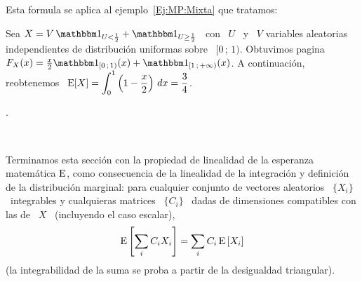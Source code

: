 {Esta formula se aplica al ejemplo~\ref{Ej:MP:Mixta} que tratamos:
%
\begin{ejemplo}\label{Ej:MP:EspMixtaPositiva}
  Sea $X = V \,  \un_{U < \frac12} + \un_{U \ge \frac12}$ \ con  \ $U$ \ y \ $V$
  variables aleatorias independientes de distribuci\'on uniformas sobre \ $[0 \,
  ;  \,  1)$. Obtuvimos  pagina~\pageref{Ej:MP:Mixta}  \  $F_X(x) =  \frac{x}{2}
  \un_{[0 \,  ; \, 1)}(x)  + \un_{[1 \,  ; \, +\infty)}(x)$.   A continuaci\'on,
  reobtenemos \ $\displaystyle \operatorname{E}[X] = \int_0^1 \left( 1 - \frac{x}{2} \right)
  \, dx = \frac34$.
\end{ejemplo}.

\

Terminamos  esta  secci\'on con  la  propiedad  de  linealidad de  la  esperanza
matem\'atica $\operatorname{E}$,  como consecuencia de  la linealidad de la  integraci\'on y
definici\'on de la distribuci\'on  marginal: para cualquier conjunto de vectores
aleatorios \ $\{  X_i \}$ \ integrables  y cualquieras matrices \ $\{  C_i \}$ \
dadas  de  dimensiones compatibles  con  las  de \  $X$  \  (incluyendo el  caso
escalar),
%
\[
\operatorname{E}\left[ \sum_i C_i X_i \right] = \sum_i C_i \operatorname{E}\left[ X_i \right]
\]
%
(la integrabilidad de la suma se proba a partir de la desigualdad triangular).
}



